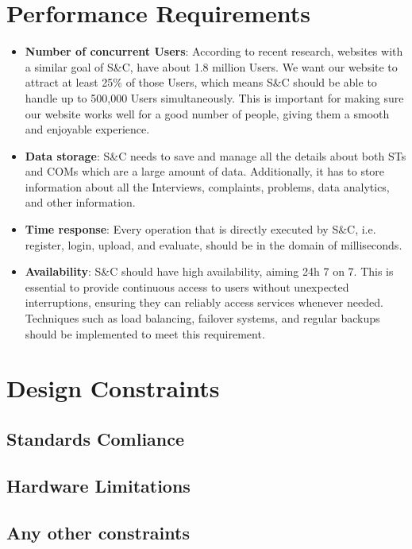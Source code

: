 \section{Performance Requirements}
\begin{itemize}
    \item \textbf{Number of concurrent Users}: According to recent research, websites with a similar goal of S\&C, have about 1.8 million Users. We want our website to attract at least 25\% of those Users, which means S\&C should be able to handle up to 500,000 Users simultaneously. This is important for making sure our website works well for a good number of people, giving them a smooth and enjoyable 
    experience.

    \item \textbf{Data storage}: S\&C needs to save and manage all the details about both STs and COMs which are a large amount of data. Additionally, it has to store information about all the Interviews, complaints, problems, data analytics, and other information.

    \item \textbf{Time response}: Every operation that is directly executed by S\&C, i.e. register, login, upload, and evaluate, should be in the domain of milliseconds. 

    \item \textbf{Availability}: S\&C should have high availability, aiming 24h 7 on 7. This is essential to provide continuous access to users without unexpected interruptions, ensuring they can reliably access services whenever needed. Techniques such as load balancing, failover systems, and regular backups should be implemented to meet this requirement.
    
\end{itemize}



\section{Design Constraints}
\subsection{Standards Comliance}
\subsection{Hardware Limitations}
\subsection{Any other constraints}

